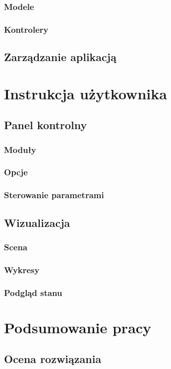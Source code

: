 \documentclass[12pt, oneside]{report}
\theoremstyle{definition}
\begin{document}
\subsection{Modele}
\subsection{Kontrolery}
\section{Zarządzanie aplikacją}


\chapter{Instrukcja użytkownika}
\section{Panel kontrolny}
\subsection{Moduły}
\subsection{Opcje}
\subsection{Sterowanie parametrami}
\section{Wizualizacja}
\subsection{Scena}
\subsection{Wykresy}
\subsection{Podgląd stanu}
	
\newpage
\chapter{Podsumowanie pracy}
\section{Ocena rozwiązania}
\end{document}
